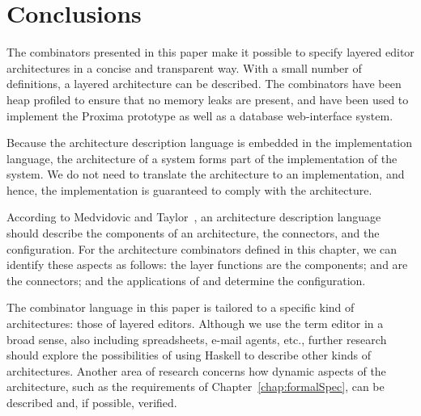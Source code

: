 \documentclass[preprint,natbib]{sigplanconf}
\begin{document}
\section{Conclusions} \label{sect:conclusions}

The combinators presented in this paper make it possible to specify layered editor architectures in a concise and transparent way. With a small number of definitions, a layered architecture can be described. The combinators have been heap profiled to ensure that no memory leaks are present, and have been used to implement the Proxima prototype as well as a database web-interface system.

Because the architecture description language is embedded in the implementation language, the architecture of a system forms part of the implementation of the system. We do not need to translate the architecture to an implementation, and hence, the implementation is guaranteed to comply with the architecture.

According to Medvidovic and Taylor~\cite{medvidovic00ADLs}, an architecture description language should describe the components of an architecture, the connectors, and the configuration. For the architecture combinators defined in this chapter, we can identify these aspects as follows: the layer functions are the components;  and  are the connectors; and the applications of  and  determine the configuration.

The combinator language in this paper is tailored to a specific kind of architectures: those of layered editors. Although we use the term editor in a broad sense, also including spreadsheets, e-mail agents, etc., further research should explore the possibilities of using Haskell to describe other kinds of architectures. Another area of research concerns how dynamic aspects of the architecture, such as the requirements of Chapter~\ref{chap:formalSpec}, can be described and, if possible, verified.









\end{document}
